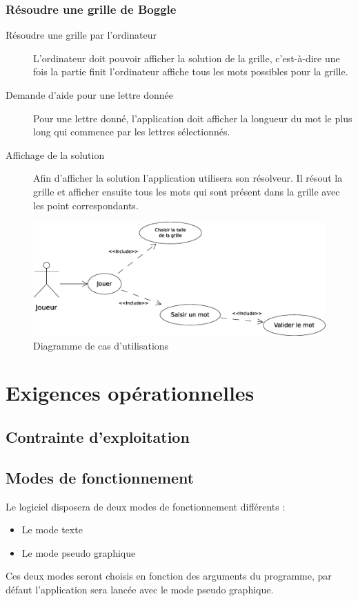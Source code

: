\documentclass[12pt,a4paper,openany]{article}
\begin{document}
	\subsubsection{Résoudre une grille de Boggle}
		\begin{description}
			\item[Résoudre une grille par l'ordinateur] 
				L'ordinateur doit pouvoir afficher la solution de la grille, c'est-à-dire une fois la partie finit l'ordinateur affiche tous les mots
				possibles pour la grille.
			\item[Demande d'aide pour une lettre donnée] Pour une lettre donné, l'application doit afficher la longueur du mot le plus long qui
				commence par les lettres sélectionnés.
			\item[Affichage de la solution] 
				Afin d'afficher la solution l'application utilisera son résolveur. Il résout la grille et afficher ensuite tous les mots qui sont
				présent dans la grille avec les point correspondants.
		\end{description}
		\begin{figure}[H]
			\centering
			\includegraphics[width=15cm]{usecase.eps}
			\caption{Diagramme de cas d'utilisations}
		\end{figure}

	\section{Exigences opérationnelles} 
	\subsection{Contrainte d'exploitation}
	\subsection{Modes de fonctionnement}
	Le logiciel disposera de deux modes de fonctionnement différents :
	\begin{itemize}
		\item Le mode texte
		\item Le mode pseudo graphique
	\end{itemize}
	Ces deux modes seront choisis en fonction des arguments du programme, par défaut l'application sera lancée avec le mode pseudo graphique.
\end{document}

